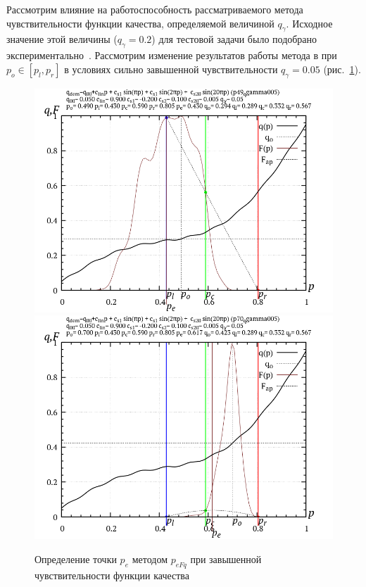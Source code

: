Рассмотрим влияние на работоспособность рассматриваемого метода
чувствительности функции качества, определяемой величиной $q_\gamma$.
Исходное значение этой величины ($q_\gamma=0.2$) для
тестовой задачи было подобрано экспериментально~\cite{atu_asau22}.
Рассмотрим изменение результатов работы метода в при $p_o \in [p_l,p_r]$
в условиях сильно завышенной чувствительности $q_\gamma=0.05$ (рис.~\ref{atu:f:p_eFq_intra_005}).


\begin{figure}[htb!]
  \centerline{
    \includegraphics[width=49\TW]{p/p_eFq/q_p_eFq_p49_qgamma005.png}
    \hfill
    \includegraphics[width=49\TW]{p/p_eFq/q_p_eFq_p70_qgamma005.png}
  }
  \caption{Определение точки $p_e$ методом $p_{eFq}$ при завышенной чувствительности функции качества}
  \label{atu:f:p_eFq_intra_005}
\end{figure}

